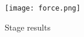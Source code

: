 \begin{figure}
\begin{center}
\texttt{[image: force.png]}
\end{center}
\caption{Stage results}
\end{figure}
%
%
%
%


\endinput
